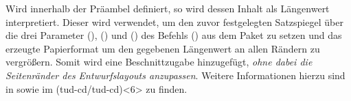 \begin{DeclareEntity}{}
\begin{Declaration}
  {}
\printdeclarationlist
%
Wird  innerhalb der Präambel definiert, so wird dessen 
Inhalt als Längenwert interpretiert. Dieser wird verwendet, um den zuvor 
festgelegten Satzspiegel über die drei Parameter
(),
() und 
() 
des Befehls () aus dem Paket 
 zu setzen und 
das erzeugte Papierformat um den gegebenen Längenwert an allen Rändern zu 
vergrößern. Somit wird eine Beschnittzugabe hinzugefügt, 
\emph{ohne dabei die Seitenränder des Entwurfslayouts anzupassen}. Weitere 
Informationen hierzu sind in  sowie im 
\GitHubRepo(tud-cd/tud-cd)<6> zu finden.
\end{Declaration}
%
\end{DeclareEntity}
